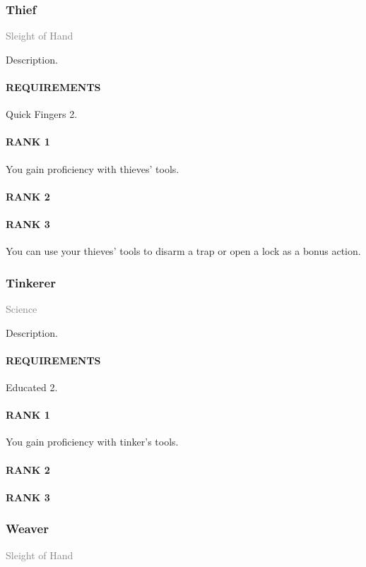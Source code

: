 \subsubsection{Thief} \label{feat::thief}
\small{\textcolor{gray}{Sleight of Hand}}

\normalsize
Description.
\paragraph{REQUIREMENTS} Quick Fingers 2.
\paragraph{RANK 1} You gain proficiency with thieves' tools.
\paragraph{RANK 2}
\paragraph{RANK 3} You can use your thieves' tools to disarm a trap or open a lock as a bonus action.

\subsubsection{Tinkerer} \label{feat::tinkerer}
\small{\textcolor{gray}{Science}}

\normalsize
Description.
\paragraph{REQUIREMENTS} Educated 2.
\paragraph{RANK 1} You gain proficiency with tinker's tools.
\paragraph{RANK 2}
\paragraph{RANK 3}

\subsubsection{Weaver} \label{feat::weaver}
\small{\textcolor{gray}{Sleight of Hand}}


